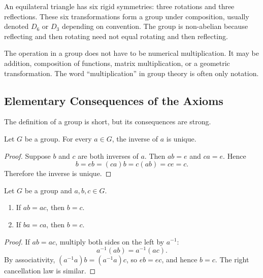 \begin{example}
An equilateral triangle has six rigid symmetries: three rotations and three reflections. These six transformations form a group under composition, usually denoted $D_6$ or $D_3$ depending on convention. The group is non-abelian because reflecting and then rotating need not equal rotating and then reflecting.
\end{example}

\begin{remark}
The operation in a group does not have to be numerical multiplication. It may be addition, composition of functions, matrix multiplication, or a geometric transformation. The word ``multiplication'' in group theory is often only notation.
\end{remark}

\subsection{Elementary Consequences of the Axioms}

The definition of a group is short, but its consequences are strong.

\begin{proposition}
Let $G$ be a group. For every $a\in G$, the inverse of $a$ is unique.
\end{proposition}

\begin{proof}
Suppose $b$ and $c$ are both inverses of $a$. Then $ab=e$ and $ca=e$. Hence
\[
    b=eb=(ca)b=c(ab)=ce=c.
\]
Therefore the inverse is unique.
\end{proof}

\begin{proposition}
Let $G$ be a group and $a,b,c\in G$.
\begin{enumerate}
    \item If $ab=ac$, then $b=c$.
    \item If $ba=ca$, then $b=c$.
\end{enumerate}
\end{proposition}

\begin{proof}
If $ab=ac$, multiply both sides on the left by $a^{-1}$:
\[
    a^{-1}(ab)=a^{-1}(ac).
\]
By associativity, $(a^{-1}a)b=(a^{-1}a)c$, so $eb=ec$, and hence $b=c$. The right cancellation law is similar.
\end{proof}

